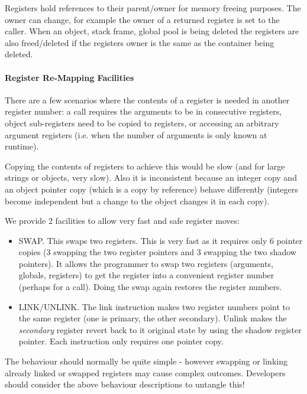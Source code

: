 Registers hold references to their parent/owner for memory freeing purposes. The owner can change, for example the owner of a returned register is set to the caller. When an object, stack frame, global pool is being deleted the registers are also freed/deleted if the registers owner is the same as the container being deleted.

\paragraph{Register Re-Mapping Facilities}

There are a few scenarios where the contents of a register is needed in another register number: a call requires the arguments to be in consecutive registers, object sub-registers need to be copied to registers, or accessing an arbitrary argument registers (i.e. when the number of arguments is only known at runtime).

Copying the contents of registers to achieve this would be slow (and for large strings or objects, very slow). Also it is inconsistent because an integer copy and an object pointer copy (which is a copy by reference) behave differently (integers become independent but a change to the object changes it in each \textquotedbl{}copy\textquotedbl{}).

We provide 2 facilities to allow very fast and safe register moves:

\begin{itemize}
\item SWAP. This swaps two registers. This is very fast as it requires only 6 pointer copies (3 swapping the two register pointers and 3 swapping the two shadow pointers). It allows the programmer to swap two registers (arguments, globals, registers) to get the register into a convenient register number (perhaps for a call). Doing the swap again restores the register numbers.

\item LINK/UNLINK. The link instruction makes two register numbers point to the same register (one is primary, the other secondary). Unlink makes the \emph{secondary} register revert back to it original state by using the shadow register pointer. Each instruction only requires one pointer copy.

\end{itemize}

The behaviour should normally be quite simple - however swapping or linking already linked or swapped registers may cause complex outcomes. Developers should consider the above behaviour descriptions to untangle this!

